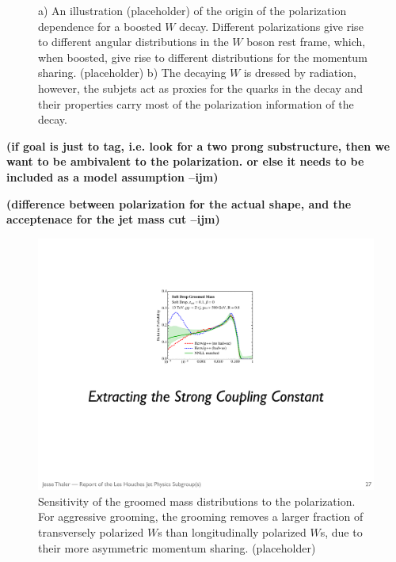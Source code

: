 \documentclass[11pt,letterpaper]{article}
\newcommand{\ijm}[1]{\textbf{\textcolor{llblue}{(#1 --ijm)}}}
\begin{document}
\begin{figure}
\begin{center}
\qquad
{}
\end{center}
\caption{a) An illustration (placeholder) of the origin of the polarization dependence for a boosted $W$ decay. Different polarizations give rise to different angular distributions in the $W$ boson rest frame, which, when boosted, give rise to different distributions for the momentum sharing. (placeholder) b) The decaying $W$ is dressed by radiation, however, the subjets act as proxies for the quarks in the decay and their properties carry most of the polarization information of the decay.
}
\label{fig:spin_boost}
\end{figure}






\ijm{if goal is just to tag, i.e. look for a two prong substructure, then we want to be ambivalent to the polarization. or else it needs to be included as a model assumption}

\ijm{difference between polarization for the actual shape, and the acceptenace for the jet mass cut}


\begin{figure}
\begin{center}
\includegraphics[width=0.4\columnwidth]{figures/mass_placeholder}
\end{center}
\caption{Sensitivity of the groomed mass distributions to the polarization. For aggressive grooming, the grooming removes a larger fraction of transversely polarized $W$s than longitudinally polarized $W$s, due to their more asymmetric momentum sharing. (placeholder)}
\end{figure}
\end{document}
